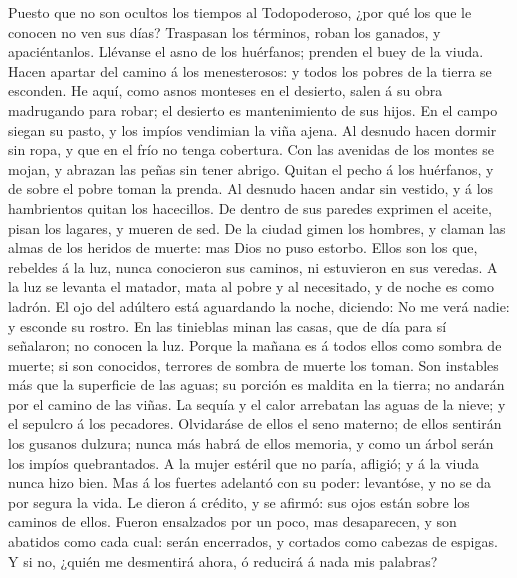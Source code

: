  Puesto que no son ocultos los tiempos al Todopoderoso,
¿por qué los que le conocen no ven sus días?  Traspasan
los términos, roban los ganados, y apaciéntanlos. 
Llévanse el asno de los huérfanos; prenden el buey de la viuda.
 Hacen apartar del camino á los menesterosos: y todos los
pobres de la tierra se esconden.  He aquí, como asnos
monteses en el desierto, salen á su obra madrugando para robar; el
desierto es mantenimiento de sus hijos.  En el campo
siegan su pasto, y los impíos vendimian la viña ajena.  Al
desnudo hacen dormir sin ropa, y que en el frío no tenga cobertura.
 Con las avenidas de los montes se mojan, y abrazan las
peñas sin tener abrigo.  Quitan el pecho á los huérfanos,
y de sobre el pobre toman la prenda.  Al desnudo hacen
andar sin vestido, y á los hambrientos quitan los hacecillos.
 De dentro de sus paredes exprimen el aceite, pisan los
lagares, y mueren de sed.  De la ciudad gimen los
hombres, y claman las almas de los heridos de muerte: mas Dios no puso
estorbo.  Ellos son los que, rebeldes á la luz, nunca
conocieron sus caminos, ni estuvieron en sus veredas.  A
la luz se levanta el matador, mata al pobre y al necesitado, y de noche
es como ladrón.  El ojo del adúltero está aguardando la
noche, diciendo: No me verá nadie: y esconde su rostro. 
En las tinieblas minan las casas, que de día para sí señalaron; no
conocen la luz.  Porque la mañana es á todos ellos como
sombra de muerte; si son conocidos, terrores de sombra de muerte los
toman.  Son instables más que la superficie de las aguas;
su porción es maldita en la tierra; no andarán por el camino de las
viñas.  La sequía y el calor arrebatan las aguas de la
nieve; y el sepulcro á los pecadores.  Olvidaráse de
ellos el seno materno; de ellos sentirán los gusanos dulzura; nunca más
habrá de ellos memoria, y como un árbol serán los impíos quebrantados.
 A la mujer estéril que no paría, afligió; y á la viuda
nunca hizo bien.  Mas á los fuertes adelantó con su
poder: levantóse, y no se da por segura la vida.  Le
dieron á crédito, y se afirmó: sus ojos están sobre los caminos de
ellos.  Fueron ensalzados por un poco, mas desaparecen, y
son abatidos como cada cual: serán encerrados, y cortados como cabezas
de espigas.  Y si no, ¿quién me desmentirá ahora, ó
reducirá á nada mis palabras?

